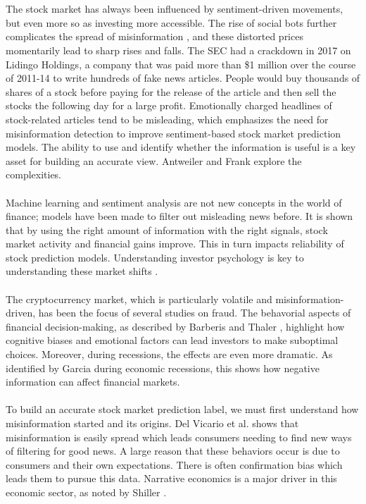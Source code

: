 \documentclass{article}
\begin{document}
\\\\
The stock market has always been influenced by sentiment-driven movements, but even more so as investing more accessible. The rise of social bots further complicates the spread of misinformation \cite{source40}, and these distorted prices momentarily lead to sharp rises and falls. The SEC had a crackdown in 2017 on Lidingo Holdings, a company that was paid more than \$1 million over the course of 2011-14 to write hundreds of fake news articles. People would buy thousands of shares of a stock before paying for the release of the article and then sell the stocks the following day for a large profit. Emotionally charged headlines of stock-related articles tend to be misleading, which emphasizes the need for misinformation detection to improve sentiment-based stock market prediction models. The ability to use and identify whether the information is useful is a key asset for building an accurate view. Antweiler and Frank \cite{source36} explore the complexities.
\\\\
Machine learning and sentiment analysis are not new concepts in the world of finance; models have been made to filter out misleading news before. It is shown that by using the right amount of information with the right signals, stock market activity and financial gains improve. This in turn impacts reliability of stock prediction models. Understanding investor psychology is key to understanding these market shifts \cite{source41}.
\\\\
The cryptocurrency market, which is particularly volatile and misinformation-driven, has been the focus of several studies on fraud. The behavorial aspects of financial decision-making, as described by Barberis and Thaler \cite{source42}, highlight how cognitive biases and emotional factors can lead investors to make suboptimal choices. Moreover, during recessions, the effects are even more dramatic. As identified by Garcia \cite{source43} during economic recessions, this shows how negative information can affect financial markets.
\\\\
To build an accurate stock market prediction label, we must first understand how misinformation started and its origins. Del Vicario et al. \cite{source37} shows that misinformation is easily spread which leads consumers needing to find new ways of filtering for good news. A large reason that these behaviors occur is due to consumers and their own expectations. There is often confirmation bias which leads them to pursue this data. Narrative economics is a major driver in this economic sector, as noted by Shiller \cite{source39}.
\end{document}
